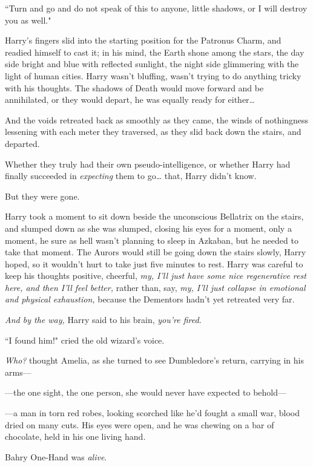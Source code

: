 ``Turn and go and do not speak of this to anyone, little shadows, or I will destroy you as well."

Harry's fingers slid into the starting position for the Patronus Charm, and readied himself to cast it; in his mind, the Earth shone among the stars, the day side bright and blue with reflected sunlight, the night side glimmering with the light of human cities. Harry wasn't bluffing, wasn't trying to do anything tricky with his thoughts. The shadows of Death would move forward and be annihilated, or they would depart, he was equally ready for either{\ldots}

And the voids retreated back as smoothly as they came, the winds of nothingness lessening with each meter they traversed, as they slid back down the stairs, and departed.

Whether they truly had their own pseudo-intelligence, or whether Harry had finally succeeded in \emph{expecting} them to go{\ldots} that, Harry didn't know.

But they were gone.

Harry took a moment to sit down beside the unconscious Bellatrix on the stairs, and slumped down as she was slumped, closing his eyes for a moment, only a moment, he sure as hell wasn't planning to sleep in Azkaban, but he needed to take that moment. The Aurors would still be going down the stairs slowly, Harry hoped, so it wouldn't hurt to take just five minutes to rest. Harry was careful to keep his thoughts positive, cheerful, \emph{my, I'll just have some nice regenerative rest here, and then I'll feel better,} rather than, say, \emph{my, I'll just collapse in emotional and physical exhaustion,} because the Dementors hadn't yet retreated very far.

\emph{And by the way,} Harry said to his brain, \emph{you're fired}.

\later

``I found him!" cried the old wizard's voice.

\emph{Who?} thought Amelia, as she turned to see Dumbledore's return, carrying in his arms---

---the one sight, the one person, she would never have expected to behold---

---a man in torn red robes, looking scorched like he'd fought a small war, blood dried on many cuts. His eyes were open, and he was chewing on a bar of chocolate, held in his one living hand.

Bahry One-Hand was \emph{alive}.


